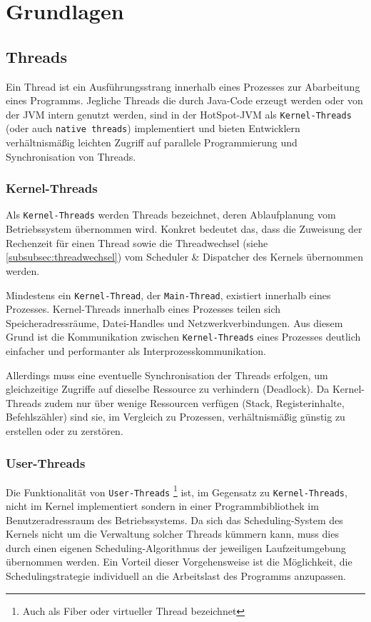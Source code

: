 \section{Grundlagen}
\label{sec:grundlagen}

\subsection{Threads}
\label{subsec:threads}
Ein Thread ist ein Ausführungsstrang innerhalb eines Prozesses zur Abarbeitung eines Programms.
Jegliche Threads die durch Java-Code erzeugt werden oder von der JVM intern genutzt werden,
sind in der HotSpot-JVM als \verb|Kernel-Threads| (oder auch \verb|native threads|) implementiert
und bieten Entwicklern verhältnismäßig leichten Zugriff auf parallele Programmierung und Synchronisation von Threads.
\parencite[Absatz Thread Management]{OpenJDKHotspotOverview}

\subsubsection{Kernel-Threads}
\label{subsubsec:kernel-threads}
Als \verb|Kernel-Threads| werden Threads bezeichnet, deren Ablaufplanung vom Betriebssystem übernommen wird.
Konkret bedeutet das, dass die Zuweisung der Rechenzeit für einen Thread sowie die Threadwechsel (siehe \ref{subsubsec:threadwechsel})
vom Scheduler \& Dispatcher des Kernels übernommen werden.

Mindestens ein \verb|Kernel-Thread|, der \verb|Main-Thread|, existiert innerhalb eines Prozesses. Kernel-Threads innerhalb eines Prozesses
teilen sich Speicheradressräume, Datei-Handles und Netzwerkverbindungen.
Aus diesem Grund ist die Kommunikation zwischen \verb|Kernel-Threads| eines Prozesses deutlich einfacher und performanter
als Interprozesskommunikation.

Allerdings muss eine eventuelle Synchronisation der Threads erfolgen, um gleichzeitige Zugriffe auf dieselbe Ressource zu verhindern
(Deadlock).
Da Kernel-Threads zudem nur über wenige Ressourcen verfügen (Stack, Registerinhalte, Befehlszähler) sind sie, im Vergleich zu Prozessen,
verhältnismäßig günstig zu erstellen oder zu zerstören. \parencite[Kapitel 2.2.5]{Tanenbaum2016}\parencite{Brosenne2021}

\subsubsection{User-Threads}
\label{subsubsec:user-threads}
Die Funktionalität von \verb|User-Threads| \footnote{Auch als Fiber oder virtueller Thread bezeichnet} ist,
im Gegensatz zu \verb|Kernel-Threads|,
nicht im Kernel implementiert sondern in einer Programmbibliothek im Benutzeradressraum des Betriebssystems.
Da sich das Scheduling-System des Kernels nicht um die Verwaltung solcher Threads kümmern kann, muss dies durch einen eigenen Scheduling-Algorithmus
der jeweiligen Laufzeitumgebung übernommen werden.
Ein Vorteil dieser Vorgehensweise ist die Möglichkeit, die Schedulingstrategie individuell an die Arbeitslast des Programms anzupassen.

